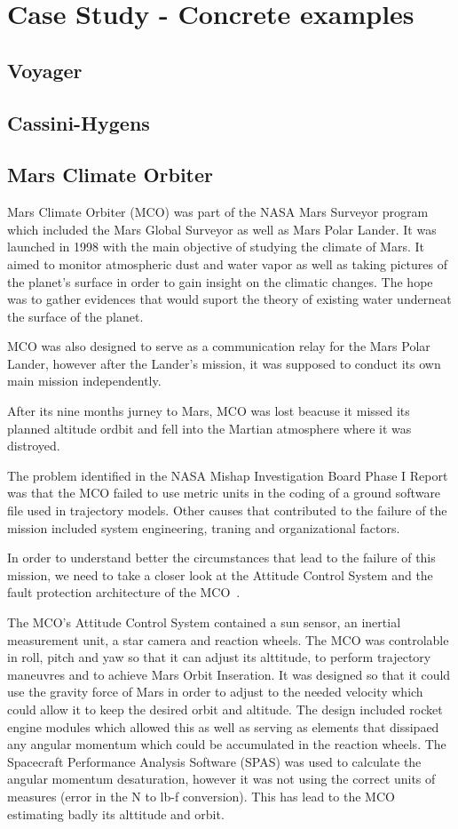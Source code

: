 \section{Case Study - Concrete examples}


\subsection{Voyager}
\subsection{Cassini-Hygens}
\subsection{Mars Climate Orbiter\cite{mco-nasa}}
Mars Climate Orbiter (MCO) was part of the NASA Mars Surveyor program which
included the Mars Global Surveyor as well as Mars Polar Lander. It was launched
in 1998 with the main objective of studying the climate of Mars. It aimed to
monitor atmospheric dust and water vapor as well as taking pictures of the
planet's surface in order to gain insight on the climatic changes. The hope was
to gather evidences that would suport the theory of existing water underneat the
surface of the planet.

MCO was also designed to serve as a communication relay for the Mars Polar
Lander, however after the Lander's mission, it was supposed to conduct its own
main mission independently.

After its nine months jurney to Mars, MCO was lost beacuse it missed its planned
altitude ordbit and fell into the Martian atmosphere where it was distroyed.

The problem identified in the NASA Mishap Investigation Board Phase I
Report~\cite{mco-rep} was that the MCO failed to use metric units in the coding
of a ground software file used in trajectory models. Other causes that contributed to the failure of the
mission included system engineering, traning and organizational factors.

In order to understand better the circumstances that lead to the failure of this
mission, we need to take a closer look at the Attitude Control System and
the fault protection architecture of the MCO~\cite{surv-nasa-mars}.

The MCO's Attitude Control System contained a sun sensor, an inertial
measurement unit, a star camera and reaction wheels. The MCO was controlable in
roll, pitch and yaw so that it can adjust its alttitude, to perform trajectory
maneuvres and to achieve Mars Orbit Inseration. It was designed so that it could
use the gravity force of Mars in order to adjust to the needed velocity which
could allow it to keep the desired orbit and altitude. The design included
rocket engine modules which allowed this as well as serving as elements that
dissipaed any angular momentum which could be accumulated in the reaction
wheels. The Spacecraft Performance Analysis Software (SPAS) was used to
calculate the angular momentum desaturation, however it was not using the
correct units of measures (error in the N to lb-f conversion). This has lead to
the MCO estimating badly its alttitude and orbit.

